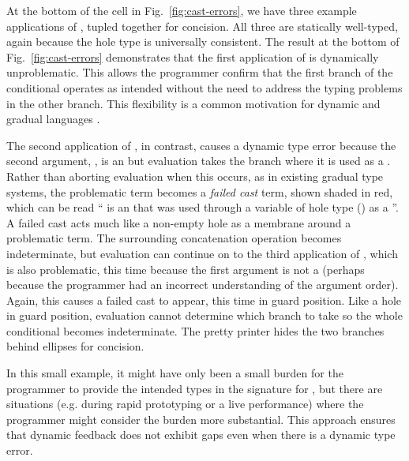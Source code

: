 At the bottom of the cell in Fig.~\ref{fig:cast-errors}, we have three 
example applications of , tupled together for concision. All three are statically
well-typed, again because the hole type is universally consistent. 
The result at the bottom of Fig.~\ref{fig:cast-errors} demonstrates that the first application
of  is dynamically unproblematic. This allows the programmer confirm that 
the first branch of the conditional operates as intended without the need to 
address the typing problems in the other branch. 
This flexibility is a common motivation for dynamic and gradual languages \cite{Bayne:2011:ASD:1985793.1985864}.

The second application of , in contrast, causes a dynamic type error because the second argument, , is an  but evaluation takes the branch where it is used as a . 
Rather than aborting evaluation when this occurs, as in existing gradual type systems, the problematic term becomes a \emph{failed cast} term, shown shaded in red, which can be read `` is an  that was used through a variable of hole type () as a ''. 
A failed cast acts much like a non-empty hole as a membrane around a problematic term. The surrounding concatenation operation becomes indeterminate, but  
evaluation can continue on to the third application of , which is also problematic, this time because the first argument is not a  (perhaps because the programmer had an incorrect understanding of the argument order). 
Again, this causes a failed cast to appear, this time in guard position. Like a hole in guard position, evaluation cannot determine which branch to take so the whole conditional becomes indeterminate. 
The pretty printer
hides the two branches behind ellipses for concision.

In this small example, it might have only been a small burden for the programmer to provide the intended types in the signature for , but there are situations (e.g. during rapid prototyping or a live performance) where the programmer might consider the burden more substantial. This approach ensures that dynamic feedback does not exhibit gaps even when there is a dynamic type error.



